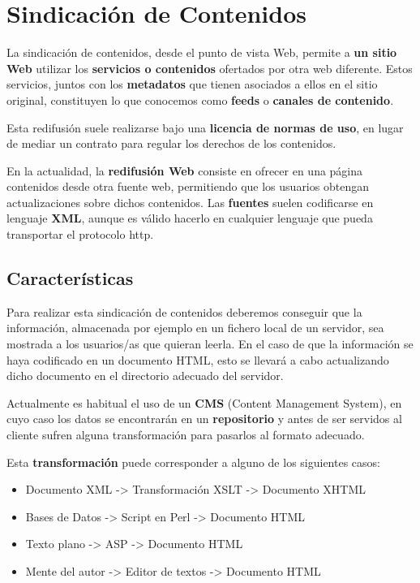 \section{Sindicación de Contenidos}
La sindicación de contenidos, desde el punto de vista Web, permite a \textbf{un sitio Web} utilizar los \textbf{servicios o contenidos} ofertados por otra web diferente. Estos servicios, juntos con los \textbf{metadatos} que tienen asociados a ellos en el sitio original, constituyen lo que conocemos como \textbf{feeds} o \textbf{canales de contenido}.

Esta redifusión suele realizarse bajo una \textbf{licencia de normas de uso}, en lugar de mediar un contrato para regular los derechos de los contenidos.

En la actualidad, la \textbf{redifusión Web} consiste en ofrecer en una página contenidos desde otra fuente web, permitiendo que los usuarios obtengan actualizaciones sobre dichos contenidos. Las \textbf{fuentes} suelen codificarse en lenguaje \textbf{XML}, aunque es válido hacerlo en cualquier lenguaje que pueda transportar el protocolo http.

\subsection{Características}
Para realizar esta sindicación de contenidos deberemos conseguir que la información, almacenada por ejemplo en un fichero local de un servidor, sea mostrada a los usuarios/as que quieran leerla. En el caso de que la información se haya codificado en un documento HTML, esto se llevará a cabo actualizando dicho documento en el directorio adecuado del servidor.

Actualmente es habitual el uso de un \textbf{CMS} (Content Management System), en cuyo caso los datos se encontrarán en un \textbf{repositorio} y antes de ser servidos al cliente sufren alguna transformación para pasarlos al formato adecuado.

Esta \textbf{transformación} puede corresponder a alguno de los siguientes casos:

\begin{itemize}
    \item Documento XML -> Transformación XSLT -> Documento XHTML
    \item Bases de Datos -> Script en Perl -> Documento HTML
    \item Texto plano -> ASP -> Documento HTML
    \item Mente del autor -> Editor de textos -> Documento HTML
\end{itemize}

